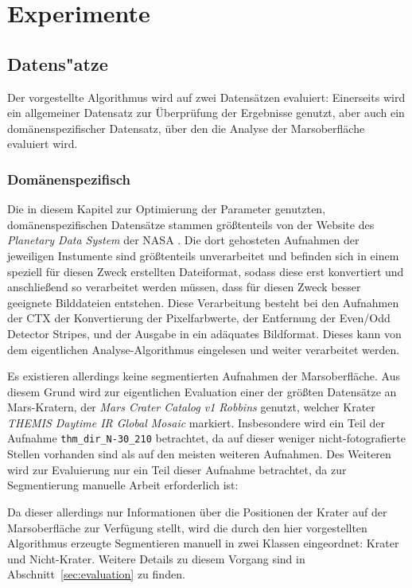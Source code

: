 \chapter{Experimente}
\label{chap:experiments}

\section{Datens"atze}
\label{sec:datasets}

Der vorgestellte Algorithmus wird auf zwei Datensätzen evaluiert: Einerseits wird ein allgemeiner Datensatz zur Überprüfung der Ergebnisse genutzt, aber auch ein domänenspezifischer Datensatz, über den die Analyse der Marsoberfläche evaluiert wird. 

\subsection{Domänenspezifisch}
\label{ssec:dataset_domain}


Die in diesem Kapitel zur Optimierung der Parameter genutzten, domänenspezifischen Datensätze stammen größtenteils von der Website des \textit{Planetary Data System} der NASA \cite{pds}. Die dort gehosteten Aufnahmen der jeweiligen Instumente sind größtenteils unverarbeitet und befinden sich in einem speziell für diesen Zweck erstellten Dateiformat, sodass diese erst konvertiert und anschließend so verarbeitet werden müssen, dass für diesen Zweck besser geeignete Bilddateien entstehen.
Diese Verarbeitung besteht bei den Aufnahmen der CTX der Konvertierung der Pixelfarbwerte, der Entfernung der Even/Odd Detector Stripes, und der Ausgabe in ein adäquates Bildformat. Dieses kann von dem eigentlichen Analyse-Algorithmus eingelesen und weiter verarbeitet werden.

Es existieren allerdings keine segmentierten Aufnahmen der Marsoberfläche. Aus diesem Grund wird zur eigentlichen Evaluation einer der größten Datensätze an Mars-Kratern, der \textit{Mars Crater Catalog v1 Robbins} \cite{robbins_12} genutzt, welcher Krater \textit{THEMIS Daytime IR Global Mosaic} markiert. Insbesondere wird ein Teil der Aufnahme \texttt{thm\_dir\_N-30\_210} betrachtet, da auf dieser weniger nicht-fotografierte Stellen vorhanden sind als auf den meisten weiteren Aufnahmen. Des Weiteren wird zur Evaluierung nur ein Teil dieser Aufnahme betrachtet, da zur Segmentierung manuelle Arbeit erforderlich ist:

Da dieser allerdings nur Informationen über die Positionen der Krater auf der Marsoberfläche zur Verfügung stellt, wird die durch den hier vorgestellten Algorithmus erzeugte Segmentieren manuell in zwei Klassen eingeordnet: Krater und Nicht-Krater. Weitere Details zu diesem Vorgang sind in Abschnitt~\ref{sec:evaluation} zu finden.

